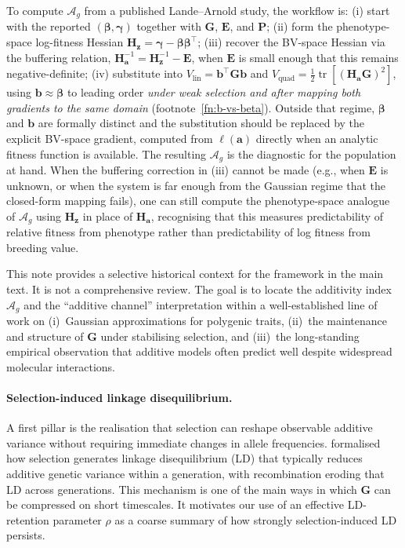 \documentclass[9pt,twocolumn,twoside,lineno]{gsajnl}
\newcommand{\vect}[1]{\boldsymbol{#1}}
\newcommand{\mat}[1]{\mathbf{#1}}
\newcommand{\tr}{\ensuremath{\operatorname{tr}}\xspace}
\newcommand{\Ag}{\ensuremath{\mathcal{A}_{g}}\xspace}
\newcommand{\Vlin}{\ensuremath{V_{\text{lin}}}\xspace}
\newcommand{\Vquad}{\ensuremath{V_{\text{quad}}}\xspace}
\begin{document}
To compute \Ag from a published Lande--Arnold study, the workflow is: (i) start with the reported $(\bm{\beta},\bm{\gamma})$ together with $\mat{G}$, $\mat{E}$, and $\mat{P}$; (ii) form the phenotype-space log-fitness Hessian $\mat{H}_{\vect{z}} = \bm{\gamma}-\bm{\beta}\bm{\beta}^{\top}$; (iii) recover the BV-space Hessian via the buffering relation, $\mat{H}_{\vect{a}}^{-1} = \mat{H}_{\vect{z}}^{-1} - \mat{E}$, when $\mat{E}$ is small enough that this remains negative-definite; (iv) substitute into $\Vlin = \vect{b}^{\top}\mat{G}\vect{b}$ and $\Vquad = \tfrac{1}{2}\tr[(\mat{H}_{\vect{a}}\mat{G})^2]$, using $\vect{b}\approx\bm{\beta}$ to leading order \emph{under weak selection and after mapping both gradients to the same domain} (footnote~\ref{fn:b-vs-beta}). Outside that regime, $\bm{\beta}$ and $\vect{b}$ are formally distinct and the substitution should be replaced by the explicit BV-space gradient, computed from $\ell(\vect{a})$ directly when an analytic fitness function is available. The resulting \Ag is the diagnostic for the population at hand. When the buffering correction in (iii) cannot be made (e.g., when $\mat{E}$ is unknown, or when the system is far enough from the Gaussian regime that the closed-form mapping fails), one can still compute the phenotype-space analogue of \Ag using $\mat{H}_{\vect{z}}$ in place of $\mat{H}_{\vect{a}}$, recognising that this measures predictability of relative fitness from phenotype rather than predictability of log fitness from breeding value.


This note provides a selective historical context for the framework in the main text. It is not a comprehensive review. The goal is to locate the additivity index \Ag and the ``additive channel'' interpretation within a well-established line of work on (i)~Gaussian approximations for polygenic traits, (ii)~the maintenance and structure of $\mat{G}$ under stabilising selection, and (iii)~the long-standing empirical observation that additive models often predict well despite widespread molecular interactions.

\paragraph{Selection-induced linkage disequilibrium.}
A first pillar is the realisation that selection can reshape observable additive variance without requiring immediate changes in allele frequencies. \citet{Bulmer1971} formalised how selection generates linkage disequilibrium (LD) that typically reduces additive genetic variance within a generation, with recombination eroding that LD across generations. This mechanism is one of the main ways in which $\mat{G}$ can be compressed on short timescales. It motivates our use of an effective LD-retention parameter $\rho$ as a coarse summary of how strongly selection-induced LD persists.
\end{document}
